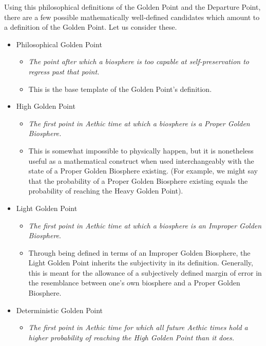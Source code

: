 Using this philosophical definitions of the Golden Point and the Departure Point, there are a few possible mathematically well-defined candidates which amount to a definition of the Golden Point. Let us consider these.
\begin{itemize}
    \item Philosophical Golden Point
    \begin{itemize}
        \item \textit{The point after which a biosphere is too capable at self-preservation to regress past that point.}
        \item This is the base template of the Golden Point's definition. 
    \end{itemize}
    \item High Golden Point
    \begin{itemize}
        \item \textit{The first point in Aethic time at which a biosphere is a Proper Golden Biosphere.}
        \item This is somewhat impossible to physically happen, but it is nonetheless useful as a mathematical construct when used interchangeably with the state of a Proper Golden Biosphere existing. (For example, we might say that the probability of a Proper Golden Biosphere existing equals the probability of reaching the Heavy Golden Point).
    \end{itemize}
    \item Light Golden Point
    \begin{itemize}
        \item \textit{The first point in Aethic time at which a biosphere is an Improper Golden Biosphere}.
        \item Through being defined in terms of an Improper Golden Biosphere, the Light Golden Point inherits the subjectivity in its definition. Generally, this is meant for the allowance of a subjectively defined margin of error in the resemblance between one's own biosphere and a Proper Golden Biosphere. 
    \end{itemize}
    \item Deterministic Golden Point
    \begin{itemize}
        \item \textit{The first point in Aethic time for which all future Aethic times hold a higher probability of reaching the High Golden Point than it does.}

\end{itemize}
\end{itemize}
